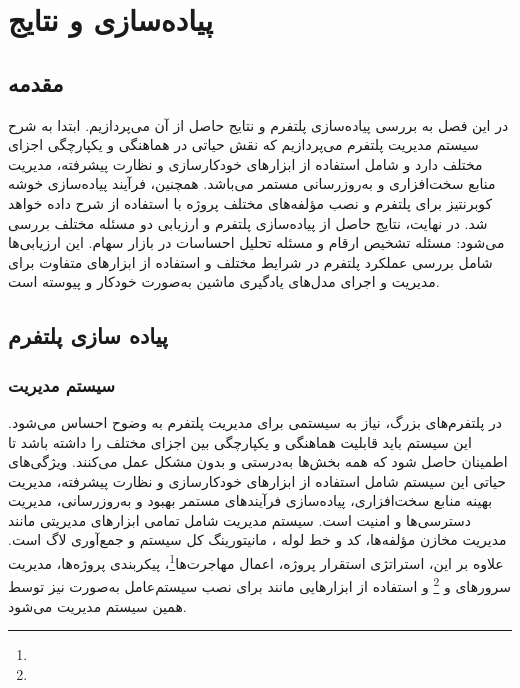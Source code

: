 \chapter{پیاده‌سازی و نتایج}

\section{مقدمه}
در این فصل به بررسی پیاده‌سازی پلتفرم و نتایج حاصل از آن می‌پردازیم. ابتدا به شرح سیستم مدیریت پلتفرم می‌پردازیم که نقش حیاتی در هماهنگی و یکپارچگی اجزای مختلف دارد و شامل استفاده از ابزارهای خودکارسازی و نظارت پیشرفته، مدیریت منابع سخت‌افزاری و به‌روزرسانی مستمر می‌باشد. همچنین، فرآیند پیاده‌سازی خوشه کوبرنتیز برای پلتفرم  و نصب مؤلفه‌های مختلف پروژه با استفاده از  شرح داده خواهد شد. در نهایت، نتایج حاصل از پیاده‌سازی پلتفرم و ارزیابی دو مسئله مختلف بررسی می‌شود: مسئله تشخیص ارقام و مسئله تحلیل احساسات در بازار سهام. این ارزیابی‌ها شامل بررسی عملکرد پلتفرم در شرایط مختلف و استفاده از ابزارهای متفاوت برای مدیریت و اجرای مدل‌های یادگیری ماشین به‌صورت خودکار و پیوسته است.

\section{پیاده سازی پلتفرم}
\subsection{سیستم مدیریت}

در پلتفرم‌های بزرگ، نیاز به سیستمی برای مدیریت پلتفرم به وضوح احساس می‌شود. این سیستم باید قابلیت هماهنگی و یکپارچگی بین اجزای مختلف را داشته باشد تا اطمینان حاصل شود که همه بخش‌ها به‌درستی و بدون مشکل عمل می‌کنند. ویژگی‌های حیاتی این سیستم شامل استفاده از ابزارهای خودکارسازی و نظارت پیشرفته، مدیریت بهینه منابع سخت‌افزاری، پیاده‌سازی فرآیندهای مستمر بهبود و به‌روزرسانی، مدیریت دسترسی‌ها و امنیت است. سیستم مدیریت شامل تمامی ابزارهای مدیریتی مانند مدیریت مخازن مؤلفه‌ها، کد و خط لوله ، مانیتورینگ کل سیستم و جمع‌آوری لاگ است. علاوه بر این، استراتژی استقرار پروژه، اعمال مهاجرت‌ها\footnote{}، پیکربندی پروژه‌ها، مدیریت سرورهای  و \footnote{} و استفاده از ابزارهایی مانند  برای نصب سیستم‌عامل به‌صورت  نیز توسط همین سیستم مدیریت می‌شود.

